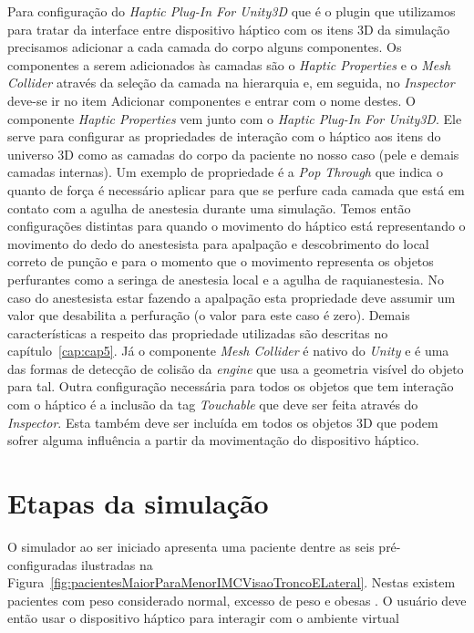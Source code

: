 Para configuração do \textit{Haptic Plug-In For Unity3D} \cite{Poyade2014} que é o plugin que utilizamos para tratar da interface entre dispositivo háptico com os itens 3D da simulação precisamos adicionar a cada camada do corpo alguns componentes. Os componentes a serem adicionados às camadas são o \textit{Haptic Properties} e o \textit{Mesh Collider} através da seleção da camada na hierarquia e, em seguida, no \textit{Inspector} deve-se ir no item Adicionar componentes e entrar com o nome destes. O componente \textit{Haptic Properties} vem junto com o \textit{Haptic Plug-In For Unity3D}. Ele serve para configurar as propriedades de interação com o háptico aos itens do universo 3D como as camadas do corpo da paciente no nosso caso (pele e demais camadas internas). Um exemplo de propriedade é a \textit{Pop Through} que indica o quanto de força é necessário aplicar para que se perfure cada camada que está em contato com a agulha de anestesia durante uma simulação. Temos então configurações distintas para quando o movimento do háptico está representando o movimento do dedo do anestesista para apalpação e descobrimento do local correto de punção e para o momento que o movimento representa os objetos perfurantes como a seringa de anestesia local e a agulha de raquianestesia. No caso do anestesista estar fazendo a apalpação esta propriedade deve assumir um valor que desabilita a perfuração (o valor para este caso é zero). Demais características a respeito das propriedade utilizadas são descritas no capítulo~\ref{cap:cap5}. Já o componente \textit{Mesh Collider} é nativo do \textit{Unity} e é uma das formas de detecção de colisão da \textit{engine} que usa a geometria visível do objeto para tal. Outra configuração necessária para todos os objetos que tem interação com o háptico é a inclusão  da tag \textit{Touchable} que deve ser feita através do \textit{Inspector}. Esta também deve ser incluída em todos os objetos 3D que podem sofrer alguma influência a partir da movimentação do dispositivo háptico.


\section {Etapas da simulação}

O simulador ao ser iniciado apresenta uma paciente dentre as seis pré-configuradas ilustradas na Figura~\ref{fig:pacientesMaiorParaMenorIMCVisaoTroncoELateral}. Nestas existem pacientes com peso considerado normal, excesso de peso e obesas \cite{MTILLC2019}. O usuário deve então usar o dispositivo háptico para interagir com o ambiente virtual

